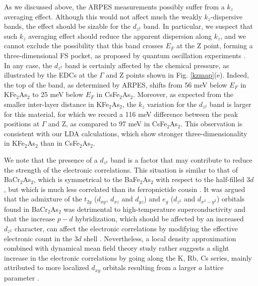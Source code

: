 \documentclass[twocolumn,aps,showpacs,preprintnumbers,amsmath,amssymb, superscriptaddress,longbibliography]{revtex4-1}
\begin{document}
As we discussed above, the ARPES measurements possibly suffer from a $k_z$ averaging effect. Although this would not affect much the weakly $k_z$-dispersive bands, the effect should be sizable for the $d_{z^2}$ band. In particular, we suspect that such $k_z$ averaging effect should reduce the apparent dispersion along $k_z$, and we cannot exclude the possibility that this band crosses $E_F$ at the Z point, forming a three-dimensional FS pocket, as proposed by quantum oscillation experiments \cite{JPSConf2014_Zocco}. In any case, the $d_{z^2}$ band is certainly affected by the chemical pressure, as illustrated by the EDCs at the $\Gamma$ and Z points shown in Fig. \ref{kzmap}(e). Indeed, the top of the band, as determined by ARPES, shifts from 56 meV below $E_F$ in KFe$_2$As$_2$ to 25 meV below $E_F$ in CsFe$_2$As$_2$. Moreover, as expected from the smaller inter-layer distance in KFe$_2$As$_2$, the $k_z$ variation for the $d_{z^2}$ band is larger for this material, for which we record a 116 meV difference between the peak positions at $\Gamma$ and Z, as compared to 97 meV in CsFe$_2$As$_2$. This observation is consistent with our LDA calculations, which show stronger three-dimensionality in KFe$_2$As$_2$ than in CsFe$_2$As$_2$.

We note that the presence of a $d_{z^2}$ band is a factor that may contribute to reduce the strength of the electronic correlations. This situation is similar to that of BaCr$_2$As$_2$, which is symmetrical to the BaFe$_2$As$_2$ with respect to the half-filled $3d$, but which is much less correlated than its ferropnictide cousin \cite{RichardPRB95, Nayak_PNAS114}. It was argued that the admixture of the $t_{2g}$ ($d_{xy}$, $d_{xz}$ and $d_{yz}$) and $e_g$ ($d_{z^2}$ and $d_{{x^2}-{y^2}}$) orbitals found in BaCr$_2$As$_2$ \cite{RichardPRB95} was detrimental to high-temperature superconductivity \cite{JP_HuPRX5} and that the increase $p-d$ hybridization, which should be affected by an increased $d_{z^2}$ character, can affect the electronic correlations by modifying the effective electronic count in the $3d$ shell \cite{Razzoli_PRB91}. Nevertheless, a local density approximation combined with dynamical mean field theory study rather suggests a slight increase in the electronic correlations by going along the K, Rb, Cs series, mainly attributed to more localized $d_{xy}$ orbitals resulting from a larger $a$ lattice parameter \cite{Backes_PRB92}.
 
\end{document}
